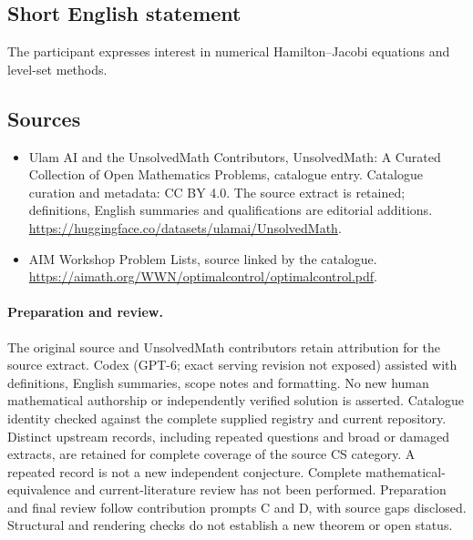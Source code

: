 \documentclass[11pt]{article}
\begin{document}
\subsection{Short English statement}
The participant expresses interest in numerical Hamilton--Jacobi equations and level-set methods.
\subsection{Sources}
\begin{itemize}
\item[\hypertarget{source:statement:1}{S1}] Ulam AI and the UnsolvedMath Contributors, UnsolvedMath: A Curated Collection of Open Mathematics Problems, catalogue entry. Catalogue curation and metadata: CC BY 4.0. The source extract is retained; definitions, English summaries and qualifications are editorial additions.
\url{https://huggingface.co/datasets/ulamai/UnsolvedMath}.
\item[\hypertarget{source:statement:2}{S2}] AIM Workshop Problem Lists, source linked by the catalogue.
\url{https://aimath.org/WWN/optimalcontrol/optimalcontrol.pdf}.
\end{itemize}
\paragraph{Preparation and review.}
The original source and UnsolvedMath contributors retain attribution for the source extract. Codex (GPT-6; exact serving revision not exposed) assisted with definitions, English summaries, scope notes and formatting. No new human mathematical authorship or independently verified solution is asserted. Catalogue identity checked against the complete supplied registry and current repository. Distinct upstream records, including repeated questions and broad or damaged extracts, are retained for complete coverage of the source CS category. A repeated record is not a new independent conjecture. Complete mathematical-equivalence and current-literature review has not been performed. Preparation and final review follow contribution prompts C and D, with source gaps disclosed. Structural and rendering checks do not establish a new theorem or open status.
\label{end:statement}
\end{document}
